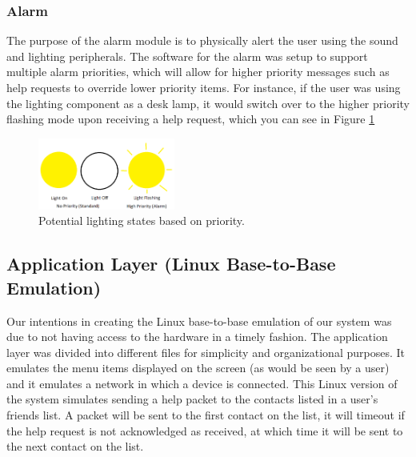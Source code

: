 \documentclass[journal,compsoc]{IEEEtran}
\begin{document}
\subsubsection{Alarm}
The purpose of the alarm module is to physically alert the user using the sound and lighting peripherals. The software for the alarm was setup to support multiple alarm priorities, which will allow for higher priority messages such as help requests to override lower priority items. For instance, if the user was using the lighting component as a desk lamp, it would switch over to the higher priority flashing mode upon receiving a help request, which you can see in Figure \ref{Alarm Priorities}
\begin{figure}[ht] 	%
\centering
\includegraphics[width=0.4\textwidth]{AlarmPriority.png}
\caption{ \space Potential lighting states based on priority.}
\label{Alarm Priorities}
\end{figure}
\subsection{Application Layer (Linux Base-to-Base Emulation)}
Our intentions in creating the Linux base-to-base emulation of our system was due to not having access to the hardware in a timely fashion.  The application layer was divided into different files for simplicity and organizational purposes.  It emulates the menu items displayed on the screen (as would be seen by a user) and it emulates a network in which a device is connected.  This Linux version of the system simulates sending a help packet to the contacts listed in a user’s friends list.  A packet will be sent to the first contact on the list, it will timeout if the help request is not acknowledged as received, at which time it will be sent to the next contact on the list.
\end{document}
